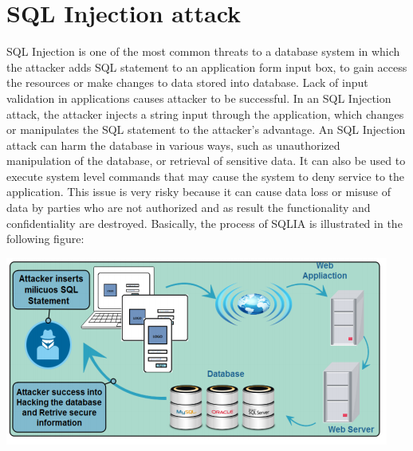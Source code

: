 \documentclass{article}
\begin{document}

\section*{SQL Injection attack} 
\hspace*{10mm}SQL Injection is one of the most common threats to a database system in which the attacker adds SQL statement to an application form input box, to gain access the resources or make changes to data stored into database. Lack of input validation in applications causes attacker to be successful. In an SQL Injection attack, the attacker injects a string input through the application, which changes or manipulates the SQL statement to the attacker's advantage. An SQL Injection attack can harm the database in various ways, such as unauthorized manipulation of the database, or retrieval of sensitive data. It can also be used to execute system level commands that may cause the system to deny service to the application. This issue is very risky because it can cause data loss or misuse of data by parties who are not authorized and as result the functionality and confidentiality are destroyed. Basically, the process of SQLIA is illustrated in the following figure:
\hspace*{10mm} \\
\begin{center}
\includegraphics[scale=1]{1}
\end{center}

\end{document}
